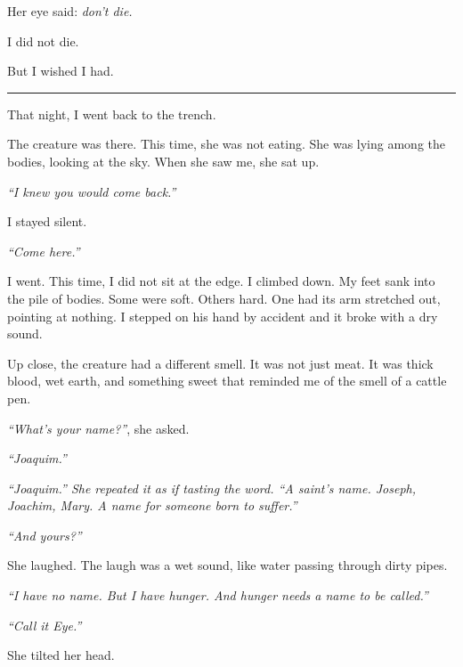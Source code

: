 \noindent Her eye said: \textit{don't die.}

\noindent I did not die.

\noindent But I wished I had.

\vspace{0.5em}\noindent\rule{\textwidth}{0.5pt}\vspace{0.5em}

\noindent That night, I went back to the trench.

\noindent The creature was there. This time, she was not eating. She was lying among the bodies, looking at the sky. When she saw me, she sat up.

\noindent \textit{\textquotedblleft{}I knew you would come back.\textquotedblright{}}

\noindent I stayed silent.

\noindent \textit{\textquotedblleft{}Come here.\textquotedblright{}}

\noindent I went. This time, I did not sit at the edge. I climbed down. My feet sank into the pile of bodies. Some were soft. Others hard. One had its arm stretched out, pointing at nothing. I stepped on his hand by accident and it broke with a dry sound.

\noindent Up close, the creature had a different smell. It was not just meat. It was thick blood, wet earth, and something sweet that reminded me of the smell of a cattle pen.

\noindent \textit{\textquotedblleft{}What's your name?\textquotedblright{}}, she asked.

\noindent \textit{\textquotedblleft{}Joaquim.\textquotedblright{}}

\noindent \textit{\textquotedblleft{}Joaquim.\textquotedblright{}\textit{ She repeated it as if tasting the word. }\textquotedblleft{}A saint's name. Joseph, Joachim, Mary. A name for someone born to suffer.\textquotedblright{}}

\noindent \textit{\textquotedblleft{}And yours?\textquotedblright{}}

\noindent She laughed. The laugh was a wet sound, like water passing through dirty pipes.

\noindent \textit{\textquotedblleft{}I have no name. But I have hunger. And hunger needs a name to be called.\textquotedblright{}}

\noindent \textit{\textquotedblleft{}Call it Eye.\textquotedblright{}}

\noindent She tilted her head.

